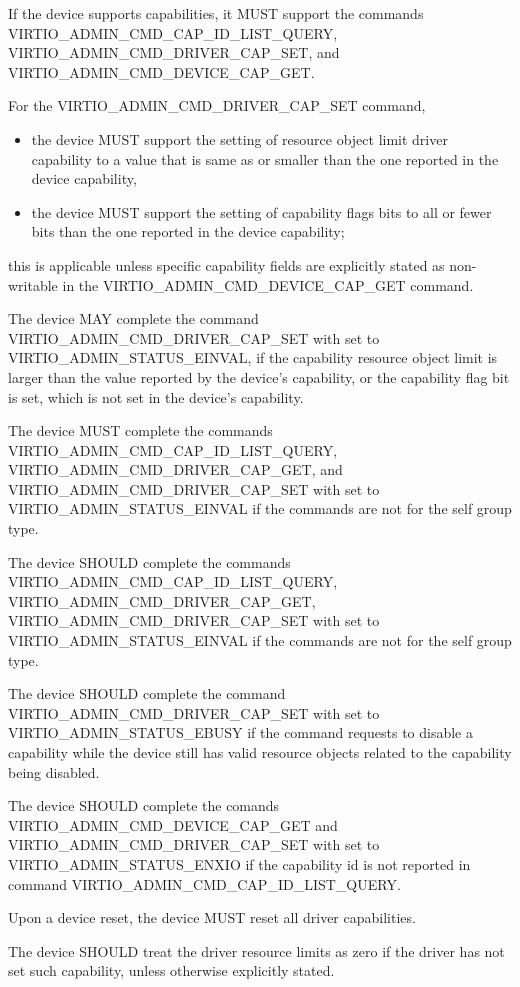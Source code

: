 If the device supports capabilities, it MUST support the commands
VIRTIO_ADMIN_CMD_CAP_ID_LIST_QUERY,
VIRTIO_ADMIN_CMD_DRIVER_CAP_SET, and
VIRTIO_ADMIN_CMD_DEVICE_CAP_GET.

For the VIRTIO_ADMIN_CMD_DRIVER_CAP_SET command,
\begin{itemize}
\item the device MUST support the setting of resource object limit driver capability to a
value that is same as or smaller than the one reported in the device
capability,
\item the device MUST support the setting of capability flags bits to
all or fewer bits than the one reported in the device capability;
\end{itemize}
this is applicable unless specific capability fields are explicitly
stated as non-writable in the VIRTIO_ADMIN_CMD_DEVICE_CAP_GET command.

The device MAY complete the command VIRTIO_ADMIN_CMD_DRIVER_CAP_SET with
 set to VIRTIO_ADMIN_STATUS_EINVAL,
if the capability resource object limit is larger than the value reported by the
device's capability, or the capability flag bit is set, which is not set in
the device's capability.

The device MUST complete the commands VIRTIO_ADMIN_CMD_CAP_ID_LIST_QUERY,
VIRTIO_ADMIN_CMD_DRIVER_CAP_GET, and VIRTIO_ADMIN_CMD_DRIVER_CAP_SET
with  set to VIRTIO_ADMIN_STATUS_EINVAL if the commands are not
for the self group type.

The device SHOULD complete the commands VIRTIO_ADMIN_CMD_CAP_ID_LIST_QUERY,
VIRTIO_ADMIN_CMD_DRIVER_CAP_GET, VIRTIO_ADMIN_CMD_DRIVER_CAP_SET with
 set to VIRTIO_ADMIN_STATUS_EINVAL if the commands are not for the
self group type.

The device SHOULD complete the command VIRTIO_ADMIN_CMD_DRIVER_CAP_SET with
 set to VIRTIO_ADMIN_STATUS_EBUSY if the command requests to disable
a capability while the device still has valid resource objects related to the
capability being disabled.

The device SHOULD complete the comands VIRTIO_ADMIN_CMD_DEVICE_CAP_GET and
VIRTIO_ADMIN_CMD_DRIVER_CAP_SET with  set to
VIRTIO_ADMIN_STATUS_ENXIO if the capability id is not reported
in command VIRTIO_ADMIN_CMD_CAP_ID_LIST_QUERY.

Upon a device reset, the device MUST reset all driver capabilities.

The device SHOULD treat the driver resource limits as zero if the
driver has not set such capability, unless otherwise explicitly stated.


